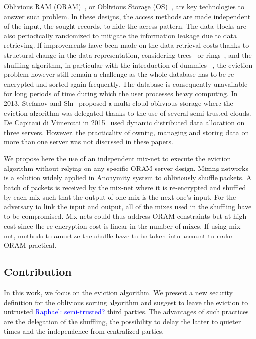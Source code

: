 \documentclass{llncs}
\newcommand{\raphael}[1]{\textcolor{blue}{Raphael: #1}}
\begin{document}
Oblivious RAM (ORAM)~\cite{goldreich87}, or Oblivious Storage (OS)~\cite{boneh2011}, are key technologies to answer such problem. In these designs, the access methods are made independent of the input, the sought records, to hide the access pattern. The data-blocks are also periodically randomized to mitigate the information leakage due to data retrieving.
If improvements have been made on the data retrieval costs thanks to structural change in the data representation, considering trees~\cite{stefanov2013path} or rings~\cite{ren2014ring}, and the shuffling algorithm, in particular with the introduction of dummies ~\cite{ohrimenko2014melbourne}, the eviction problem however still remain a challenge as the whole database has to be re-encrypted and sorted again frequently. The database is consequently unavailable for long periods of time during which the user processes heavy computing.
In 2013, Stefanov and Shi~\cite{stefanov2013} proposed a multi-cloud oblivious storage where the eviction algorithm was delegated thanks to the use of several semi-trusted clouds. De Capitani di Vimercati in 2015~\cite{dithree} used dynamic distributed data allocation on three servers.
However, the practicality of owning, managing and storing data on more than one server was not discussed in these papers.

We propose here the use of an independent mix-net to execute the eviction algorithm without relying on any specific ORAM server design.
Mixing networks is a solution widely applied in Anonymity system to obliviously shuffle packets. A batch of packets is received by the mix-net where it is re-encrypted and shuffled by each mix such that the output of one mix is the next one’s input.
For the adversary to link the input and output, all of the mixes used in the shuffling have to be compromised.
Mix-nets could thus address ORAM constraints but at high cost since the re-encryption cost is linear in the number of mixes. If using mix-net, methods to amortize the shuffle have to be taken into account to make ORAM practical.

%
\subsection{Contribution}\label{Contribution}
%
In this work, we focus on the eviction algorithm. We present a new security definition for the oblivious sorting algorithm and suggest to leave the eviction to untrusted \raphael{semi-trusted?} third parties.
The advantages of such practices are the delegation of the shuffling, the possibility to delay the latter to quieter times and the independence from centralized parties.
\end{document}
